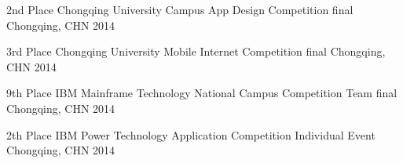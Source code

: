 



\begin{cvhonors}

  \cvhonor
    {2nd Place} %
    {Chongqing University Campus App Design Competition final} %
    {Chongqing, CHN} %
    {2014} %

  \cvhonor
    {3rd Place} %
    {Chongqing University Mobile Internet Competition final} %
    {Chongqing, CHN} %
    {2014} %

  \cvhonor
    {9th Place} %
    {IBM Mainframe Technology National Campus Competition Team final} %
    {Chongqing, CHN} %
    {2014} %

  \cvhonor
    {2th Place} %
    {IBM Power Technology Application Competition Individual Event} %
    {Chongqing, CHN} %
    {2014} %

\end{cvhonors}